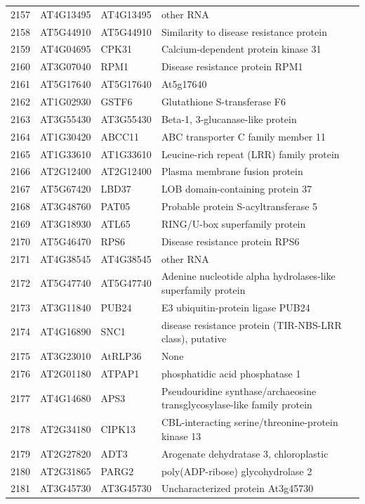 \documentclass[11pt]{article}
\begin{document}
\begin{center}
\begin{tabular}{rlll}
2157 & AT4G13495 & AT4G13495 & other RNA\\
2158 & AT5G44910 & AT5G44910 & Similarity to disease resistance protein\\
2159 & AT4G04695 & CPK31 & Calcium-dependent protein kinase 31\\
2160 & AT3G07040 & RPM1 & Disease resistance protein RPM1\\
2161 & AT5G17640 & AT5G17640 & At5g17640\\
2162 & AT1G02930 & GSTF6 & Glutathione S-transferase F6\\
2163 & AT3G55430 & AT3G55430 & Beta-1, 3-glucanase-like protein\\
2164 & AT1G30420 & ABCC11 & ABC transporter C family member 11\\
2165 & AT1G33610 & AT1G33610 & Leucine-rich repeat (LRR) family protein\\
2166 & AT2G12400 & AT2G12400 & Plasma membrane fusion protein\\
2167 & AT5G67420 & LBD37 & LOB domain-containing protein 37\\
2168 & AT3G48760 & PAT05 & Probable protein S-acyltransferase 5\\
2169 & AT3G18930 & ATL65 & RING/U-box superfamily protein\\
2170 & AT5G46470 & RPS6 & Disease resistance protein RPS6\\
2171 & AT4G38545 & AT4G38545 & other RNA\\
2172 & AT5G47740 & AT5G47740 & Adenine nucleotide alpha hydrolases-like superfamily protein\\
2173 & AT3G11840 & PUB24 & E3 ubiquitin-protein ligase PUB24\\
2174 & AT4G16890 & SNC1 & disease resistance protein (TIR-NBS-LRR class), putative\\
2175 & AT3G23010 & AtRLP36 & None\\
2176 & AT2G01180 & ATPAP1 & phosphatidic acid phosphatase 1\\
2177 & AT4G14680 & APS3 & Pseudouridine synthase/archaeosine transglycosylase-like family protein\\
2178 & AT2G34180 & CIPK13 & CBL-interacting serine/threonine-protein kinase 13\\
2179 & AT2G27820 & ADT3 & Arogenate dehydratase 3, chloroplastic\\
2180 & AT2G31865 & PARG2 & poly(ADP-ribose) glycohydrolase 2\\
2181 & AT3G45730 & AT3G45730 & Uncharacterized protein At3g45730\\

\end{tabular}
\end{center}
\end{document}
